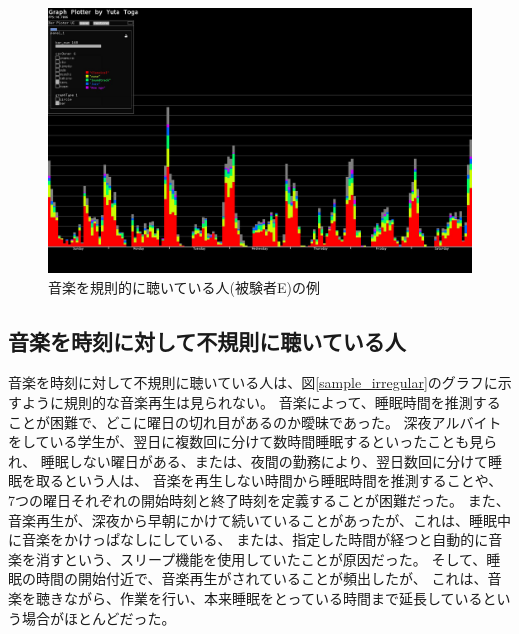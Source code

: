 \documentclass[11pt, onecolumn]{jsarticle}
\begin{document}
\begin{figure}[h]
\begin{center}
\includegraphics[width=14cm]{sample_regular.jpg}
\caption{音楽を規則的に聴いている人(被験者E)の例}
\label{sample_regular}
\end{center}
\end{figure}

\subsection{音楽を時刻に対して不規則に聴いている人}
音楽を時刻に対して不規則に聴いている人は、図\ref{sample_irregular}のグラフに示すように規則的な音楽再生は見られない。
音楽によって、睡眠時間を推測することが困難で、どこに曜日の切れ目があるのか曖昧であった。
深夜アルバイトをしている学生が、翌日に複数回に分けて数時間睡眠するといったことも見られ、
睡眠しない曜日がある、または、夜間の勤務により、翌日数回に分けて睡眠を取るという人は、
音楽を再生しない時間から睡眠時間を推測することや、
7つの曜日それぞれの開始時刻と終了時刻を定義することが困難だった。
また、音楽再生が、深夜から早朝にかけて続いていることがあったが、これは、睡眠中に音楽をかけっぱなしにしている、
または、指定した時間が経つと自動的に音楽を消すという、スリープ機能を使用していたことが原因だった。
そして、睡眠の時間の開始付近で、音楽再生がされていることが頻出したが、
これは、音楽を聴きながら、作業を行い、本来睡眠をとっている時間まで延長しているという場合がほとんどだった。
\end{document}
